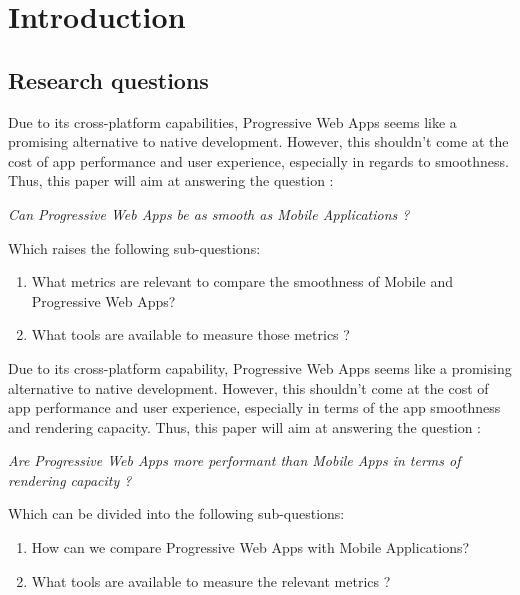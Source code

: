 

\chapter{Introduction}
\section{Research questions}

Due to its cross-platform capabilities, Progressive Web Apps seems like a promising alternative to native development. However, this shouldn't come at the cost of app performance and user experience, especially in regards to smoothness.
Thus, this paper will aim at answering the question : 
\begin{center}
    \textit{Can Progressive Web Apps be as smooth as Mobile Applications ?}
\end{center}
Which raises the following sub-questions: 
\begin{enumerate}
    \item What metrics are relevant to compare the smoothness of Mobile and Progressive Web Apps?
    \item What tools are available to measure those metrics ?
\end{enumerate}

Due to its cross-platform capability, Progressive Web Apps seems like a promising alternative to native development. However, this shouldn't come at the cost of app performance and user experience, especially in terms of the app smoothness and rendering capacity.
Thus, this paper will aim at answering the question : 
\begin{center}
    \textit{Are Progressive Web Apps more performant than Mobile Apps in terms of rendering capacity ?}
\end{center}
Which can be divided into the following sub-questions: 
\begin{enumerate}
    \item How can we compare Progressive Web Apps with Mobile Applications?
    \item What tools are available to measure the relevant metrics ?
\end{enumerate}

